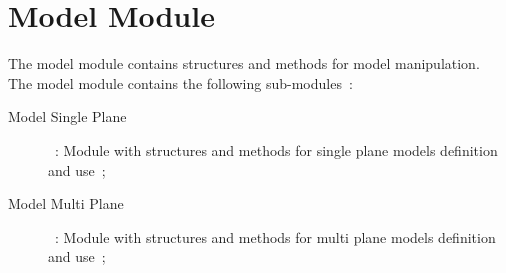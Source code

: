 \chapter{Model Module}
\label{cha:model}
The model module contains structures and methods for model manipulation.\\

The model module contains the following sub-modules~:

\begin{description}
  \item[Model Single Plane]~: Module with structures and methods for single plane models definition and use~;
  \item[Model Multi Plane]~: Module with structures and methods for multi plane models definition and use~;
\end{description}



